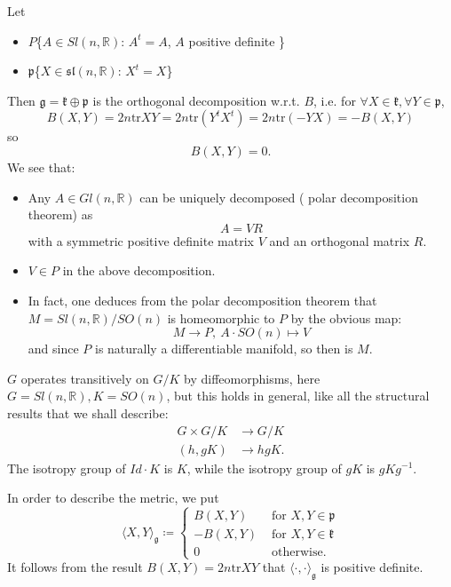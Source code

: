 	Let
	\begin{itemize}
		\item $P$\coloneq \{$A \in S l(n, \mathbb{R})$: $A^{t}=A$, $A$
		{ positive definite }\}
		\item $\mathfrak p$\coloneq \{$X\in
		\mathfrak{sl}(n,\mathbb{R})$: $X^t=X$\}
	\end{itemize}
	Then  $\mathfrak{g}=\mathfrak{k} \oplus \mathfrak{p}$ is the
	orthogonal decomposition w.r.t. $B$, i.e. 
	for $\forall X\in \mathfrak k, \forall Y\in \mathfrak p$, 
	\[
	B(X,Y)=2n\text{tr}
	XY=2n\text{tr}(Y^tX^t)=2n\text{tr}(-YX)=-B(X,Y)
	\]
	so
	\[B(X,Y)=0.\]
	We see that:
	\begin{itemize}
		\item 	Any $A \in Gl(n, \mathbb{R})$ can be uniquely
		decomposed ( polar decomposition theorem) as
		\[
		A=V R
		\]
		with a symmetric positive definite matrix $V$ and an
		orthogonal matrix $R$.
	 
		\item $V \in P$ in the above decomposition.
		
		\item In fact, one deduces from the polar decomposition
		theorem that $M=S l(n, \mathbb{R}) / S O(n)$ is
		homeomorphic to $P$ by the obvious map:
		\[
		M\to P,\ A\cdot S O(n)\mapsto V
		\]
		and since $P$ is naturally a differentiable manifold, so
		then is $M$.
	\end{itemize}
	
	

	$G$ operates transitively on $G / K$ by diffeomorphisms, here
	$G=S l(n, \mathbb{R}), K=S O(n)$, but this holds in general,
	like all the structural results that we shall describe:
	\[
	\begin{aligned}
		G \times G / K & \rightarrow G / K \\
		(h, g K) & \rightarrow h g K .
	\end{aligned}
	\]
	The isotropy group of $Id \cdot K$ is $K$, while the isotropy group of $g K$ is $g K g^{-1}$.
	
	
	In order to describe the metric, we put
	\[
	\langle X, Y\rangle_{\mathfrak{g}}\coloneq \left\{\begin{array}{cl}
		B(X, Y) & \text { for } X, Y \in \mathfrak{p} \\
		-B(X, Y) & \text { for } X, Y \in \mathfrak{k} \\
		0 & \text { otherwise. }
	\end{array}\right.
	\]
	It follows from the result $B(X,Y)=2n\text{tr} XY$ that
	$\langle\cdot, \cdot\rangle_{\mathfrak g}$ is positive
	definite. 

